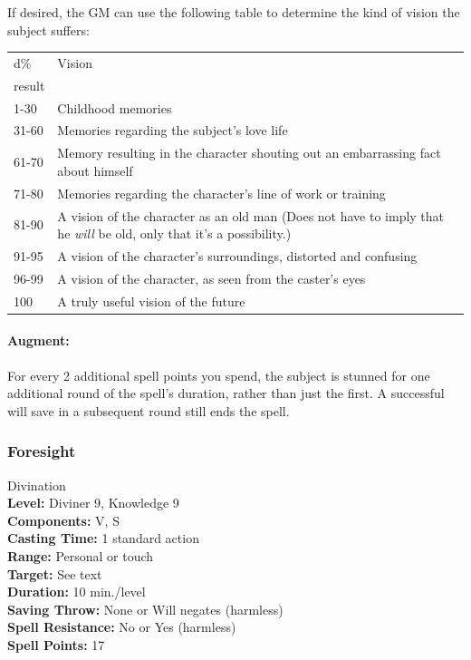 If desired, the GM can use the following table to determine the kind of vision the subject suffers:
\begin{center}
\small
\begin{tabular}{|p{1cm}|p{5.4cm}|}
\hline
d\% & Vision\\
result&\\
\hline
1-30 & Childhood memories\\
31-60 & Memories regarding the subject's love life\\
61-70 & Memory resulting in the character shouting out an embarrassing fact about himself\\
71-80 & Memories regarding the character's line of work or training\\
81-90 & A vision of the character as an old man (Does not have to imply that he \emph{will} be old, only that it's a possibility.)\\
91-95 & A vision of the character's surroundings, distorted and confusing\\
96-99 & A vision of the character, as seen from the caster's eyes\\
100 & A truly useful vision of the future\\
\hline
\end{tabular}
\end{center}
\paragraph{Augment:} For every 2 additional spell points you spend, the subject is stunned for one additional round of the
spell's duration, rather than just the first. A successful will save in a subsequent round still ends the spell.

\subsubsection{Foresight}
\label{Spell:Foresight}
Divination
\\ \textbf{Level:} Diviner 9, Knowledge 9
\\ \textbf{Components:} V, S
\\ \textbf{Casting Time:} 1 standard action
\\ \textbf{Range:} Personal or touch
\\ \textbf{Target:} See text
\\ \textbf{Duration:} 10 min./level
\\ \textbf{Saving Throw:} None or Will negates (harmless)
\\ \textbf{Spell Resistance:} No or Yes (harmless)
\\ \textbf{Spell Points:} 17

